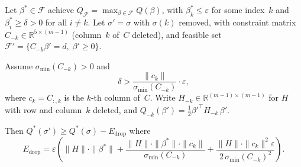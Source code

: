 \begin{lemma}%
\label{lem:near-boundary-drop}
Let $\beta^* \in \mathcal{F}$ achieve
$Q_{\mathcal{F}} = \max_{\beta \in \mathcal{F}} Q(\beta)$,
with $\beta^*_k \leq \varepsilon$ for some index~$k$
and $\beta^*_i \geq \delta > 0$ for all $i \neq k$.
Let $\sigma' = \sigma$ with $\sigma(k)$ removed,
with constraint matrix $C_{-k} \in \mathbb{R}^{5 \times (m-1)}$
(column~$k$ of~$C$ deleted), and feasible set
$\mathcal{F}' = \{C_{-k}\beta' = d,\; \beta' \geq 0\}$.

Assume $\sigma_{\min}(C_{-k}) > 0$ and
\begin{equation}\label{eq:positivity-condition}
  \delta > \frac{\|c_k\|}{\sigma_{\min}(C_{-k})} \cdot \varepsilon,
\end{equation}
where $c_k = C_{:,k}$ is the $k$-th column of~$C$.
Write $H_{-k} \in \mathbb{R}^{(m-1) \times (m-1)}$ for $H$
with row and column~$k$ deleted,
and $Q_{-k}(\beta') = \tfrac{1}{2}\beta'^\top H_{-k}\, \beta'$.

Then $Q^*(\sigma') \geq Q^*(\sigma) - E_{\mathrm{drop}}$ where
\begin{equation}\label{eq:combined-drop-bound}
  E_{\mathrm{drop}}
  = \varepsilon \left(
    \|H\| \cdot \|\beta^*\|
    + \frac{\|H\| \cdot \|\beta^*\| \cdot \|c_k\|}
           {\sigma_{\min}(C_{-k})}
    + \frac{\|H\| \cdot \|c_k\|^2 \varepsilon}
           {2\, \sigma_{\min}(C_{-k})^2}
  \right).
\end{equation}
\end{lemma}

